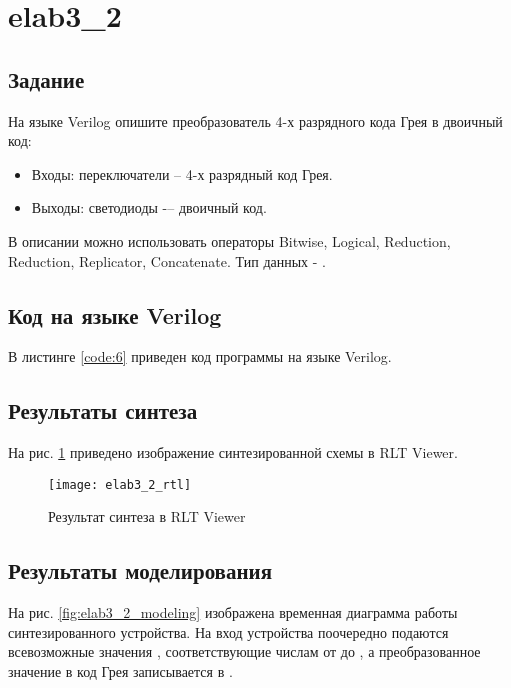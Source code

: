 \section{elab3\_2}

\subsection{Задание}

На языке Verilog опишите преобразователь 4-х разрядного кода Грея в двоичный код:
\begin{itemize}
	\item Входы: переключатели  -- 4-х разрядный код Грея.
	\item Выходы: светодиоды  -– двоичный код.
\end{itemize}

В описании можно использовать операторы Bitwise, Logical, Reduction, Reduction, Replicator, Concatenate. Тип данных - .

\subsection{Код на языке Verilog}

В листинге \ref{code:6} приведен код программы на языке Verilog.



\subsection{Результаты синтеза}

На рис. \ref{fig:elab3_2_rtl} приведено изображение синтезированной схемы в RLT Viewer.

\begin{figure}[H]
\begin{center}
	\texttt{[image: elab3\_2\_rtl]}
	\caption{Результат синтеза в RLT Viewer}
	\label{fig:elab3_2_rtl}
\end{center}
\end{figure}

\subsection{Результаты моделирования}
\label{sec:elab3_2_modeling}

На рис. \ref{fig:elab3_2_modeling} изображена временная диаграмма работы синтезированного устройства. На вход устройства поочередно подаются всевозможные значения , соответствующие числам от  до , а преобразованное значение в код Грея записывается в .


